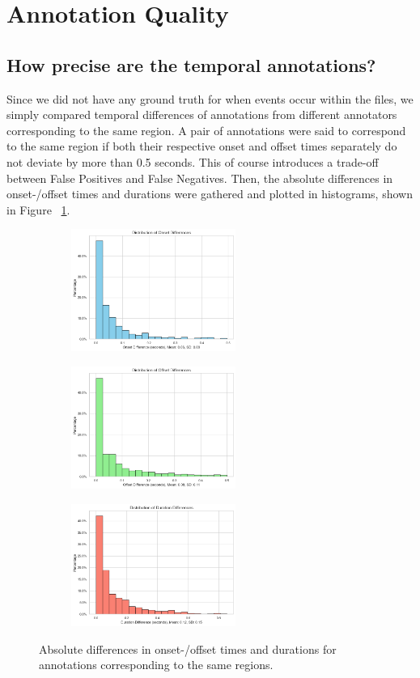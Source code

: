 
\section{Annotation Quality} 
\label{sec:Annotation Quality}


\subsection{How precise are the temporal annotations?}
\label{sec:Annotation Quality:a1}
Since we did not have any ground truth for when events occur within the files, we simply compared temporal differences of annotations from different annotators corresponding to the same region. A pair of annotations were said to correspond to the same region if both their respective onset and offset times separately do not deviate by more than 0.5 seconds. This of course introduces a trade-off between False Positives and False Negatives.
Then, the absolute differences in onset-/offset times and durations were gathered and plotted in histograms, shown in Figure ~\ref{fig:2_a}.

\begin{figure}[htbp]
  \centering
  \begin{subfigure}[b]{0.33\textwidth}
    \includegraphics[width=\textwidth, height=4cm]{figs/onset_diffs.png}
  \end{subfigure}
  \hfill
  \begin{subfigure}[b]{0.33\textwidth}
    \includegraphics[width=\textwidth, height=4cm]{figs/offset_diffs.png}
  \end{subfigure}
  \hfill
  \begin{subfigure}[b]{0.33\textwidth}
    \includegraphics[width=\textwidth, height=4cm]{figs/duration_diffs.png}
  \end{subfigure}
  \caption{Absolute differences in onset-/offset times and durations for annotations corresponding to the same regions.}
  \label{fig:2_a}
\end{figure}

